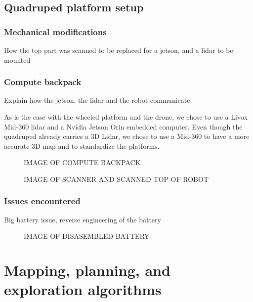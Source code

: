 \documentclass[11pt]{article}
\begin{document}
        \subsection{Quadruped platform setup}


            \subsubsection{Mechanical modifications}

            How the top part was scanned to be replaced for a jetson, and a lidar to be mounted

            \subsubsection{Compute backpack}

            Explain how the jetson, the lidar and the robot communicate.

            As is the case with the wheeled platform and the drone, we chose to use a Livox Mid-360 lidar and a Nvidia Jetson Orin embedded computer. Even though the quadruped already carries a 3D Lidar, we chose to use a Mid-360 to have a more accurate 3D map and to standardize the platforms.


            \begin{figure}[H]
                \centering
                IMAGE OF COMPUTE BACKPACK
            \end{figure}


            \begin{figure}[H]
                \centering
                IMAGE OF SCANNER AND SCANNED TOP OF ROBOT
            \end{figure}

            \subsubsection{Issues encountered}

            Big battery issue, reverse engineering of the battery


            \begin{figure}[H]
                \centering
                IMAGE OF DISASEMBLED BATTERY
            \end{figure}

        \newpage

    \section{Mapping, planning, and exploration algorithms}
\end{document}
